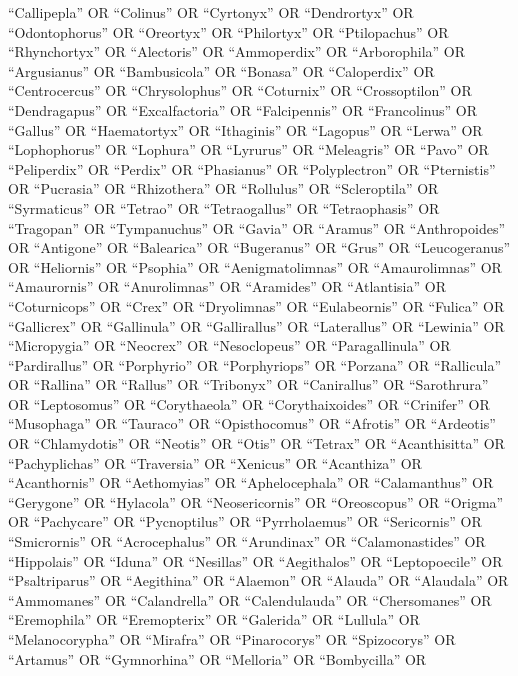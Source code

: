 \documentclass[
  number,
  review,
  onecolumn]{elsarticle}
\begin{document}
``Callipepla'' OR ``Colinus'' OR ``Cyrtonyx'' OR ``Dendrortyx'' OR
``Odontophorus'' OR ``Oreortyx'' OR ``Philortyx'' OR ``Ptilopachus'' OR
``Rhynchortyx'' OR ``Alectoris'' OR ``Ammoperdix'' OR ``Arborophila'' OR
``Argusianus'' OR ``Bambusicola'' OR ``Bonasa'' OR ``Caloperdix'' OR
``Centrocercus'' OR ``Chrysolophus'' OR ``Coturnix'' OR ``Crossoptilon''
OR ``Dendragapus'' OR ``Excalfactoria'' OR ``Falcipennis'' OR
``Francolinus'' OR ``Gallus'' OR ``Haematortyx'' OR ``Ithaginis'' OR
``Lagopus'' OR ``Lerwa'' OR ``Lophophorus'' OR ``Lophura'' OR
``Lyrurus'' OR ``Meleagris'' OR ``Pavo'' OR ``Peliperdix'' OR ``Perdix''
OR ``Phasianus'' OR ``Polyplectron'' OR ``Pternistis'' OR ``Pucrasia''
OR ``Rhizothera'' OR ``Rollulus'' OR ``Scleroptila'' OR ``Syrmaticus''
OR ``Tetrao'' OR ``Tetraogallus'' OR ``Tetraophasis'' OR ``Tragopan'' OR
``Tympanuchus'' OR ``Gavia'' OR ``Aramus'' OR ``Anthropoides'' OR
``Antigone'' OR ``Balearica'' OR ``Bugeranus'' OR ``Grus'' OR
``Leucogeranus'' OR ``Heliornis'' OR ``Psophia'' OR ``Aenigmatolimnas''
OR ``Amaurolimnas'' OR ``Amaurornis'' OR ``Anurolimnas'' OR ``Aramides''
OR ``Atlantisia'' OR ``Coturnicops'' OR ``Crex'' OR ``Dryolimnas'' OR
``Eulabeornis'' OR ``Fulica'' OR ``Gallicrex'' OR ``Gallinula'' OR
``Gallirallus'' OR ``Laterallus'' OR ``Lewinia'' OR ``Micropygia'' OR
``Neocrex'' OR ``Nesoclopeus'' OR ``Paragallinula'' OR ``Pardirallus''
OR ``Porphyrio'' OR ``Porphyriops'' OR ``Porzana'' OR ``Rallicula'' OR
``Rallina'' OR ``Rallus'' OR ``Tribonyx'' OR ``Canirallus'' OR
``Sarothrura'' OR ``Leptosomus'' OR ``Corythaeola'' OR
``Corythaixoides'' OR ``Crinifer'' OR ``Musophaga'' OR ``Tauraco'' OR
``Opisthocomus'' OR ``Afrotis'' OR ``Ardeotis'' OR ``Chlamydotis'' OR
``Neotis'' OR ``Otis'' OR ``Tetrax'' OR ``Acanthisitta'' OR
``Pachyplichas'' OR ``Traversia'' OR ``Xenicus'' OR ``Acanthiza'' OR
``Acanthornis'' OR ``Aethomyias'' OR ``Aphelocephala'' OR
``Calamanthus'' OR ``Gerygone'' OR ``Hylacola'' OR ``Neosericornis'' OR
``Oreoscopus'' OR ``Origma'' OR ``Pachycare'' OR ``Pycnoptilus'' OR
``Pyrrholaemus'' OR ``Sericornis'' OR ``Smicrornis'' OR ``Acrocephalus''
OR ``Arundinax'' OR ``Calamonastides'' OR ``Hippolais'' OR ``Iduna'' OR
``Nesillas'' OR ``Aegithalos'' OR ``Leptopoecile'' OR ``Psaltriparus''
OR ``Aegithina'' OR ``Alaemon'' OR ``Alauda'' OR ``Alaudala'' OR
``Ammomanes'' OR ``Calandrella'' OR ``Calendulauda'' OR ``Chersomanes''
OR ``Eremophila'' OR ``Eremopterix'' OR ``Galerida'' OR ``Lullula'' OR
``Melanocorypha'' OR ``Mirafra'' OR ``Pinarocorys'' OR ``Spizocorys'' OR
``Artamus'' OR ``Gymnorhina'' OR ``Melloria'' OR ``Bombycilla'' OR
\end{document}
